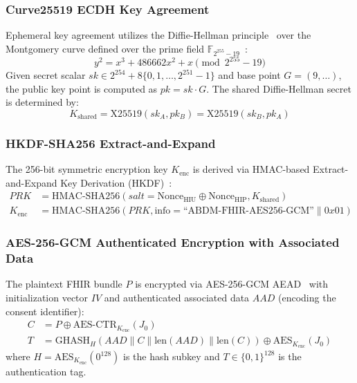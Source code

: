 \documentclass[journal,twocolumn]{IEEEtran}
\begin{document}
\subsubsection{Curve25519 ECDH Key Agreement}
Ephemeral key agreement utilizes the Diffie-Hellman principle~\cite{diffie_hellman} over the Montgomery curve defined over the prime field $\mathbb{F}_{2^{255}-19}$~\cite{bernstein_curve25519}:
\begin{equation}
    y^2 = x^3 + 486662x^2 + x \pmod{2^{255}-19}
\end{equation}
Given secret scalar $sk \in 2^{254} + 8\{0, 1, \dots, 2^{251}-1\}$ and base point $G = (9, \dots)$, the public key point is computed as $pk = sk \cdot G$. The shared Diffie-Hellman secret is determined by:
\begin{equation}
    K_{\text{shared}} = \text{X25519}(sk_A, pk_B) = \text{X25519}(sk_B, pk_A)
\end{equation}

\subsubsection{HKDF-SHA256 Extract-and-Expand}
The 256-bit symmetric encryption key $K_{\text{enc}}$ is derived via HMAC-based Extract-and-Expand Key Derivation (HKDF)~\cite{krawczyk_hkdf}:
\begin{align}
    PRK &= \text{HMAC-SHA256}(salt = \text{Nonce}_{\text{HIU}} \oplus \text{Nonce}_{\text{HIP}}, K_{\text{shared}}) \\
    K_{\text{enc}} &= \text{HMAC-SHA256}(PRK, \text{info} = \text{``ABDM-FHIR-AES256-GCM''} \parallel 0x01)
\end{align}

\subsubsection{AES-256-GCM Authenticated Encryption with Associated Data}
The plaintext FHIR bundle $P$ is encrypted via AES-256-GCM AEAD~\cite{dworkin_gcm} with initialization vector $IV$ and authenticated associated data $AAD$ (encoding the consent identifier):
\begin{align}
    C &= P \oplus \text{AES-CTR}_{K_{\text{enc}}}(J_0) \\
    T &= \text{GHASH}_H(AAD \parallel C \parallel \text{len}(AAD) \parallel \text{len}(C)) \oplus \text{AES}_{K_{\text{enc}}}(J_0)
\end{align}
where $H = \text{AES}_{K_{\text{enc}}}(0^{128})$ is the hash subkey and $T \in \{0, 1\}^{128}$ is the authentication tag.
\end{document}
